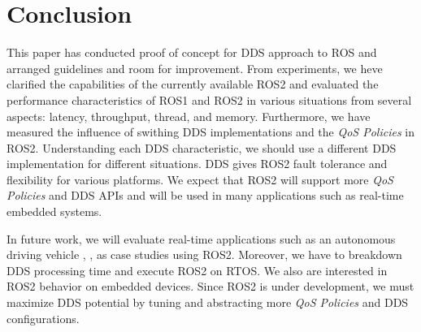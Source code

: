 \documentclass{sig-alternate-05-2015}
\begin{document}
\section{Conclusion}
\label{sec:orgheadline4}
This paper has conducted proof of concept for DDS approach to ROS and arranged guidelines and room for improvement.
From experiments, we heve clarified the capabilities of the currently available ROS2 and evaluated the performance characteristics of ROS1 and ROS2 in various situations from several aspects: latency, throughput, thread, and memory.
Furthermore, we have measured the influence of swithing DDS implementations and the \emph{QoS Policies} in ROS2.
Understanding each DDS characteristic, we should use a different DDS implementation for different situations.
DDS gives ROS2 fault tolerance and flexibility for various platforms.
We expect that ROS2 will support more \emph{QoS Policies} and DDS APIs and will be used in many applications such as real-time embedded systems.

In future work, we will evaluate real-time applications such as an autonomous driving vehicle \cite{kato2015open}, \cite{saito2014fusion}, as case studies using ROS2. 
Moreover, we have to breakdown DDS processing time and execute ROS2 on RTOS.
We also are interested in ROS2 behavior on embedded devices.
Since ROS2 is under development, we must maximize DDS potential by tuning and abstracting more \emph{QoS Policies} and DDS configurations.



\end{document}
